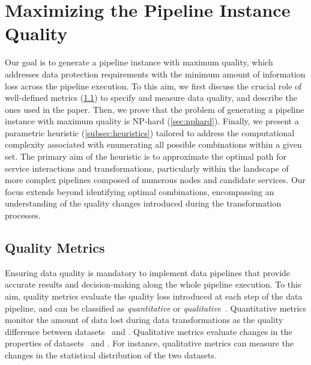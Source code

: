 \section{Maximizing the Pipeline Instance Quality}\label{sec:heuristics}
%
Our goal is to generate a pipeline instance with maximum quality, which addresses data protection requirements with the minimum amount of information loss across the pipeline execution. To this aim, we first discuss the crucial role of well-defined metrics (\cref{sec:metrics}) to specify and measure data quality, and describe the ones used in the paper.
Then, we prove that the problem of generating a pipeline instance with maximum quality is NP-hard (\cref{sec:nphard}). Finally, we present a parametric heuristic (\cref{subsec:heuristics}) tailored to address the computational complexity associated with enumerating all possible combinations within a given set. The primary aim of the heuristic is to approximate the optimal path for service interactions and transformations, particularly within the landscape of more complex pipelines composed of numerous nodes and candidate services. Our focus extends beyond identifying optimal combinations, encompassing an understanding of the quality changes introduced during the transformation processes.


\subsection{Quality Metrics}\label{sec:metrics}
Ensuring data quality is mandatory to implement data pipelines that provide accurate results and decision-making along the whole pipeline execution. To this aim, quality metrics evaluate the quality loss introduced at each step of the data pipeline, and can be classified as \emph{quantitative} or \emph{qualitative}~\cite{ADD}. 
Quantitative metrics monitor the amount of data lost during data transformations as the quality difference between datasets \origdataset\ and \transdataset.
Qualitative metrics evaluate changes in the properties of datasets \origdataset\ and \transdataset. For instance, qualitative metrics can measure the changes in the statistical distribution of the two datasets.


